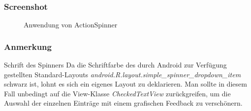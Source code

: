 \begin{frame}
   \frametitle{Screenshot}
   \begin{figure}[h!]
     \centering
     \hfill
     \caption{
        Anwendung von ActionSpinner
     }
     \label{fig:action_spinner}
   \end{figure}
\end{frame}

\begin{frame}
   \frametitle{Anmerkung}
   \begin{alertblock}{Schrift des Spinners}
      Da die Schriftfarbe des durch Android zur Verfügung gestellten Standard-Layouts 
      \emph{android.R.layout.simple\_spinner\_dropdown\_item} schwarz ist, lohnt es sich 
      ein eigenes Layout zu deklarieren. Man sollte in diesem Fall unbedingt auf 
      die View-Klasse \emph{CheckedTextView} zurückgreifen, um die Auswahl der 
      einzelnen Einträge mit einem grafischen Feedback zu verschönern.
   \end{alertblock}
\end{frame}
